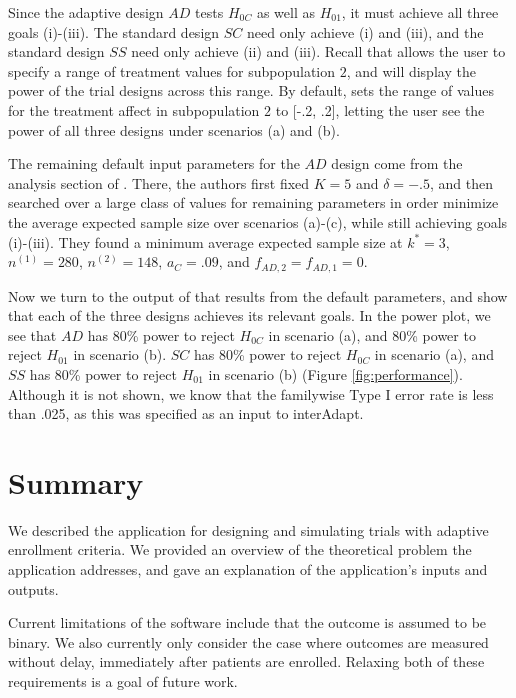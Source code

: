 \documentclass[article]{jss}
\begin{document}
Since the adaptive design $AD$ tests $H_{0C}$ as well as $H_{01}$, it must achieve all three goals (i)-(iii). The standard design $SC$ need only achieve (i) and (iii), and the standard design $SS$ need only achieve (ii) and (iii). Recall that  allows the user to specify a range of treatment values for subpopulation $2$, and will display the power of the trial designs across this range. By default,  sets the range of values for the treatment affect in subpopulation $2$ to [-.2, .2], letting the user see the power of all three designs under scenarios (a) and (b). 
 
The remaining default input parameters for the $AD$ design come from the analysis section of \citep{Rosenblum2013AdaptMISTIE}. There, the authors first fixed $K=5$ and $δ=-.5$, and then searched over a large class of values for remaining parameters in order minimize the average expected sample size over scenarios (a)-(c), while still achieving goals (i)-(iii). They found a minimum average expected sample size at $k^*=3$, $n^{(1)}=280$, $n^{(2)}=148$, $a_C = .09$, and $f_{AD,2}=f_{AD,1}=0$. %

Now we turn to the output of  that results from the default parameters, and show that each of the three designs achieves its relevant goals. In the power plot, we see that $AD$ has 80\% power to reject $H_{0C}$ in scenario (a), and 80\% power to reject $H_{01}$ in scenario (b). $SC$ has 80\% power to reject $H_{0C}$ in scenario (a), and $SS$ has 80\% power to reject $H_{01}$ in scenario (b) (Figure \ref{fig:performance}). Although it is not shown, we know that the familywise Type I error rate is less than .025, as this was specified as an input to \textsf{interAdapt}.




\section*{Summary}
\label{sec:Summary}

We described the  application for designing and simulating trials with adaptive enrollment criteria. We provided an overview of the theoretical problem the application addresses, and gave an explanation of the application's inputs and outputs.

Current limitations of the software include that the outcome is assumed to be binary. We also currently only consider the case where outcomes are measured without delay, immediately after patients are enrolled. Relaxing both of these requirements is a goal of future work.
\end{document}
